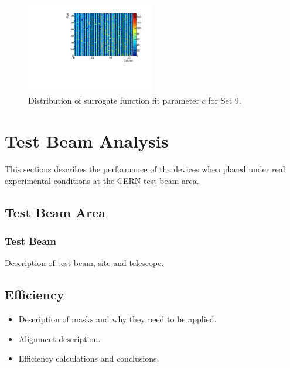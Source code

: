 \begin{figure}
\centering
\includegraphics[width=0.5\textwidth]{CLICdpVertex/Plots/TestPulseCalibration/FitParam/FitParamC_Set9.pdf}
\caption[Distribution as a function of matrix position of surrogate function fit parameter $c$ for Set 9.]{Distribution of surrogate function fit parameter $c$ for Set 9.}
\end{figure}


\section{Test Beam Analysis}
\label{sec:testbeam}
This sections describes the performance of the devices when placed under real experimental conditions at the CERN test beam area.  


\subsection{Test Beam Area}

\subsubsection{Test Beam}

Description of test beam, site and telescope.

\subsection{Efficiency}

\begin{itemize}
\item Description of masks and why they need to be applied.
\item Alignment description.
\item Efficiency calculations and conclusions. 
\end{itemize}

